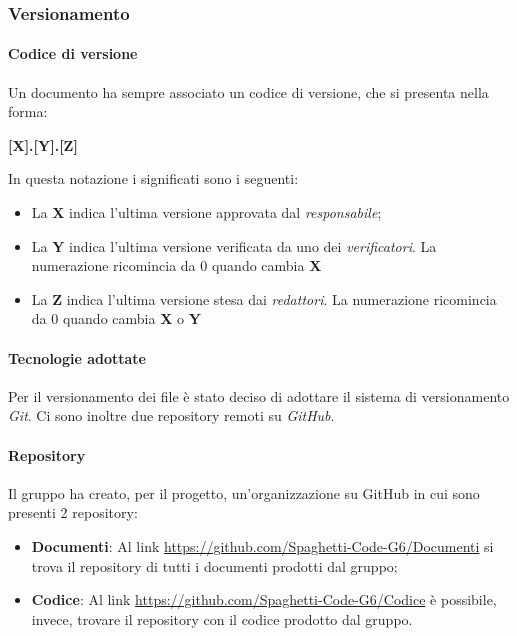 \documentclass[../norme_di_progetto.tex]{subfiles}
\begin{document}
\subsubsection{Versionamento}

\paragraph{Codice di versione}
Un documento ha sempre associato un codice di versione, che si presenta nella forma:
\begin{center}
    \textbf{[X].[Y].[Z]}
\end{center}

In questa notazione i significati sono i seguenti:
\begin{itemize}
    \item La \textbf{X} indica l'ultima versione approvata dal \emph{responsabile};
    \item La \textbf{Y} indica l'ultima versione verificata da uno dei \emph{verificatori}. La numerazione ricomincia da 0 quando cambia \textbf{X}
    \item La \textbf{Z} indica l'ultima versione stesa dai \emph{redattori}. La numerazione ricomincia da 0 quando cambia \textbf{X} o \textbf{Y}
\end{itemize}

\paragraph{Tecnologie adottate}
Per il versionamento dei file è stato deciso di adottare il sistema di versionamento \emph{Git}. Ci sono inoltre due repository remoti su \emph{GitHub}.

\paragraph{Repository}
Il gruppo ha creato, per il progetto, un'organizzazione su GitHub in cui sono presenti 2 repository:
\begin{itemize}
    \item \textbf{Documenti}: Al link \url{https://github.com/Spaghetti-Code-G6/Documenti} si trova il repository di tutti i documenti prodotti dal gruppo;
    \item \textbf{Codice}: Al link \url{https://github.com/Spaghetti-Code-G6/Codice} è possibile, invece, trovare il repository con il codice prodotto dal gruppo.
\end{itemize}
\end{document}
